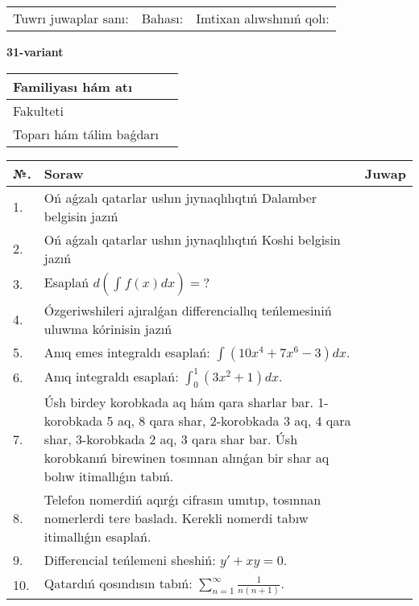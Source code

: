 \documentclass{article}
\begin{document}
\vspace{1cm}

\begin{tabular}{ c c c }
Tuwrı juwaplar sanı: \underline{\hspace{2cm}} & Bahası: \underline{\hspace{2cm}} & Imtixan alıwshınıń qolı: \underline{\hspace{2cm}} \\
\end{tabular}

\newpage

\begin{center}\textbf{31-variant}\end{center}

\bgroup
\def\arraystretch{1.5}
\begin{tabular}{ |m{6cm}|m{10cm}| }
  \hline
  Familiyası hám atı & \\
  \hline
  Fakulteti &\\
  \hline
  Toparı hám tálim baǵdarı & \\
  \hline
\end{tabular}
\egroup

\vspace{0.5cm}

\bgroup
\def\arraystretch{2}
\begin{tabular}{ |l|m{8cm}|m{7cm}| }
  \hline
  №. & Soraw & Juwap \\
  \hline
  1. & Oń aǵzalı qatarlar ushın jıynaqlılıqtıń Dalamber belgisin jazıń &  \\
  \hline
  2. & Oń aǵzalı qatarlar ushın jıynaqlılıqtıń Koshi belgisin jazıń &  \\
  \hline
  3. & Esaplań $\displaystyle d\left( \int_{}^{}{f(x)dx} \right) = ?$ &  \\
  \hline
  4. & Ózgeriwshileri ajıralǵan differenciallıq teńlemesiniń uluwma kórinisin jazıń &  \\
  \hline
  5. & Anıq emes integraldı esaplań: $\displaystyle\int \left( 10x^{4} + 7x^{6} - 3 \right)dx$. &  \\
  \hline
  6. & Anıq integraldı esaplań: $\displaystyle\int_{0}^{1}{(3x^{2} + 1)dx}$. &  \\
  \hline
  7. & Úsh birdey korobkada aq hám qara sharlar bar. 1-korobkada 5 aq, 8 qara shar, 2-korobkada 3 aq, 4 qara shar, 3-korobkada 2 aq, 3 qara shar bar. Úsh korobkanıń birewinen tosınnan alınǵan bir shar aq bolıw itimallıǵın tabıń. &  \\
  \hline
  8. & Telefon nomerdiń aqırǵı cifrasın umıtıp, tosınnan nomerlerdi tere basladı. Kerekli nomerdi tabıw itimallıǵın esaplań. &  \\
  \hline
  9. & Differencial teńlemeni sheshiń: $y' + xy = 0$. &  \\
  \hline
  10. & Qatardıń qosındısın tabıń: $\displaystyle\sum_{n = 1}^{\infty}\frac{1}{n(n + 1)}$. &  \\
  \hline
\end{tabular}
\egroup
\end{document}
